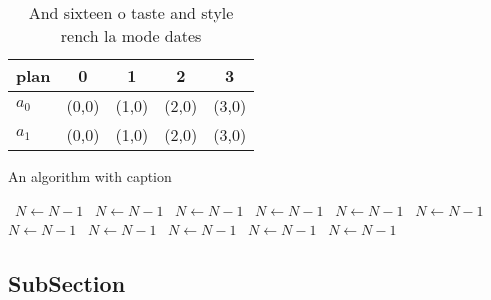 \documentclass[a4paper]{article}
\begin{document}
\begin{table}
\begin{adjustbox}{width=0.7\columnwidth}
\begin{tabular}{|l|l|l|l|l|}
\hline
\textbf{plan} & \multicolumn{1}{c|}{\textbf{0}} & \multicolumn{1}{c|}{\textbf{1}} & \multicolumn{1}{c|}{\textbf{2}} & \multicolumn{1}{c|}{\textbf{3}} \\ \hline
\textbf{$a_0$}  & (0,0) & (1,0) & (2,0) & (3,0) \\ \hline
\textbf{$a_1$}  & (0,0) & (1,0) & (2,0) & (3,0) \\ \hline
\end{tabular}
\end{adjustbox}
\caption{And sixteen o taste and style rench la mode dates
}
\end{table}

\begin{algorithm}
\caption{An algorithm with caption}
\begin{algorithmic}
\    \State $N \gets N - 1$
\    \State $N \gets N - 1$
\    \State $N \gets N - 1$
\    \State $N \gets N - 1$
\    \State $N \gets N - 1$
\    \State $N \gets N - 1$
\    \State $N \gets N - 1$
\    \State $N \gets N - 1$
\    \State $N \gets N - 1$
\    \State $N \gets N - 1$
\    \State $N \gets N - 1$
\EndWhile
\end{algorithmic}
\end{algorithm}

\subsection{SubSection}
\end{document}
